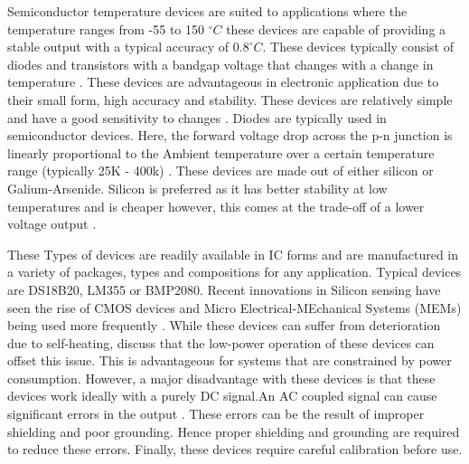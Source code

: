  Semiconductor temperature devices are suited to applications where the temperature ranges from -55 to 150 $^\circ C$ these devices are capable of providing a stable output with a typical accuracy of $0.8 ^\circ C$. These devices typically consist of diodes and transistors with a bandgap voltage that changes with a change in temperature \cite{childs2000review}. These devices are advantageous in electronic application due to their small form, high accuracy and stability. These devices are relatively simple and have a good sensitivity to changes \cite{childs2000review}. Diodes are typically used in semiconductor devices. Here, the forward voltage drop across the p-n junction is linearly proportional to the Ambient temperature over a certain temperature range (typically 25K - 400k) \cite{childs2000review}. These devices are made out of either silicon or Galium-Arsenide. Silicon is preferred as it has better stability at low temperatures and is cheaper however, this comes at the trade-off of a lower voltage output \cite{childs2000review}. \par These Types of devices are readily available in IC forms and are manufactured in a variety of packages, types and compositions for any application. Typical devices are DS18B20, LM355 or BMP2080. Recent innovations in Silicon sensing have seen the rise of CMOS devices and Micro Electrical-MEchanical Systems (MEMs) being used more frequently \cite{mansoor2015silicon}. While these devices can suffer from deterioration due to self-heating, \textcite{mansoor2015silicon} discuss that the low-power operation of these devices can offset this issue. This is advantageous for systems that are constrained by power consumption. However, a major disadvantage with these devices is that these devices work ideally with a purely DC signal.An AC coupled signal can cause significant errors in the output \cite{childs2000review} \cite{mansoor2015silicon}. These errors can be the result of improper shielding and poor grounding. Hence proper shielding and grounding are required to reduce these errors. Finally, these devices require careful calibration before use.
 
